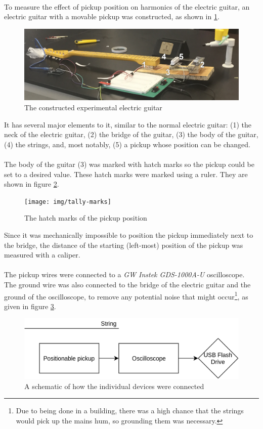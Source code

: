 \documentclass{article}
\begin{document}
\paragraph*{}
To measure the effect of pickup position on harmonics of the electric guitar, 
an electric guitar with a movable pickup was constructed, as shown in 
\ref{fig:custom-guitar}.
\begin{figure}[ht]
	\centering
	\includegraphics[width=.8\textwidth]{img/constructed-guitar}
	\caption{The constructed experimental electric guitar}
	\label{fig:custom-guitar}
\end{figure}
It has several major elements to it, similar to the normal electric guitar: 
(1) the neck of the electric guitar, (2) the bridge of the guitar, (3) the 
body of the guitar, (4) the strings, and, most notably, (5) a pickup whose 
position can be changed.

\paragraph*{}
The body of the guitar (3) was marked with hatch marks so the pickup could be 
set to a desired value. These hatch marks were marked using a ruler. They are 
shown in figure \ref{fig:hatch-marks}.
\begin{figure}[ht]
	\centering
	\texttt{[image: img/tally-marks]}
	\caption{The hatch marks of the pickup position}
	\label{fig:hatch-marks}
\end{figure}
Since it was mechanically impossible to position the pickup immediately next 
to the bridge, the distance of the starting (left-most) position of the pickup 
was measured with a caliper.

\paragraph*{}
The pickup wires were connected to a \textit{GW Instek GDS-1000A-U} 
oscilloscope. The ground wire was also connected to the bridge of the electric 
guitar and the ground of the oscilloscope, to remove any potential noise that 
might occur\footnote{Due to being done in a building, there was a high chance
	that the strings would pick up the mains hum, so grounding them was
necessary.}, as given in figure \ref{fig:connection-schematic}.
\begin{figure}[ht]
	\centering
	\includegraphics[width=.5\textwidth]{img/connection-schematic}
	\caption{A schematic of how the individual devices were connected}
	\label{fig:connection-schematic}
\end{figure}
\end{document}
